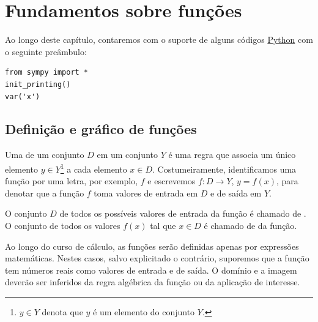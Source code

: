 
\chapter{Fundamentos sobre funções}\label{cap_funcao}
\thispagestyle{fancy}

\ifispython
\begin{obs}\label{obs:cap_funcao_python}
Ao longo deste capítulo, contaremos com o suporte de alguns códigos \href{https://www.python.org/}{Python} com o seguinte preâmbulo:
\begin{verbatim}
from sympy import *
init_printing()
var('x')
\end{verbatim}
\end{obs}
\fi

\section{Definição e gráfico de funções}\label{cap_funcao_sec_defgrafico}

Uma  de um conjunto $D$ em um conjunto $Y$ é uma regra que associa um único elemento $y\in Y$\footnote{$y\in Y$ denota que $y$ é um elemento do conjunto $Y$.} a cada elemento $x\in D$. Costumeiramente, identificamos uma função por uma letra, por exemplo, $f$ e escrevemos $f:D\to Y$, $y=f(x)$, para denotar que a função $f$ toma valores de entrada em $D$ e de saída em $Y$.

O conjunto $D$ de todos os possíveis valores de entrada da função é chamado de . O conjunto de todos os valores $f(x)$ tal que $x\in D$ é chamado de  da função.

Ao longo do curso de cálculo, as funções serão definidas apenas por expressões matemáticas. Nestes casos, salvo explicitado o contrário, suporemos que a função tem números reais como valores de entrada e de saída. O domínio e a imagem deverão ser inferidos da regra algébrica da função ou da aplicação de interesse.

